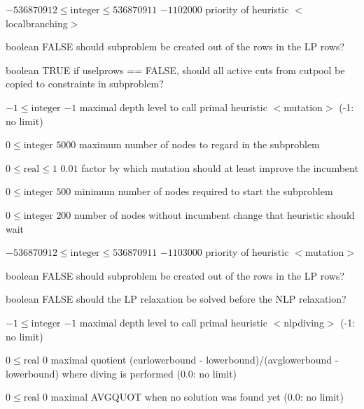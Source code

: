 %
{$-536870912\leq\textrm{integer}\leq536870911$}%
{$-1102000$}%
{priority of heuristic $<$localbranching$>$}%
{}

%
{boolean}%
{FALSE}%
{should subproblem be created out of the rows in the LP rows?}%
{}

%
{boolean}%
{TRUE}%
{if uselprows == FALSE, should all active cuts from cutpool be copied to constraints in subproblem?}%
{}

%
{$-1\leq\textrm{integer}$}%
{$-1$}%
{maximal depth level to call primal heuristic $<$mutation$>$ (-1: no limit)}%
{}

%
{$0\leq\textrm{integer}$}%
{$5000$}%
{maximum number of nodes to regard in the subproblem}%
{}

%
{$0\leq\textrm{real}\leq1$}%
{$0.01$}%
{factor by which mutation should at least improve the incumbent}%
{}

%
{$0\leq\textrm{integer}$}%
{$500$}%
{minimum number of nodes required to start the subproblem}%
{}

%
{$0\leq\textrm{integer}$}%
{$200$}%
{number of nodes without incumbent change that heuristic should wait}%
{}

%
{$-536870912\leq\textrm{integer}\leq536870911$}%
{$-1103000$}%
{priority of heuristic $<$mutation$>$}%
{}

%
{boolean}%
{FALSE}%
{should subproblem be created out of the rows in the LP rows?}%
{}

%
{boolean}%
{FALSE}%
{should the LP relaxation be solved before the NLP relaxation?}%
{}

%
{$-1\leq\textrm{integer}$}%
{$-1$}%
{maximal depth level to call primal heuristic $<$nlpdiving$>$ (-1: no limit)}%
{}

%
{$0\leq\textrm{real}$}%
{$0$}%
{maximal quotient (curlowerbound - lowerbound)/(avglowerbound - lowerbound) where diving is performed (0.0: no limit)}%
{}

%
{$0\leq\textrm{real}$}%
{$0$}%
{maximal AVGQUOT when no solution was found yet (0.0: no limit)}%
{}

